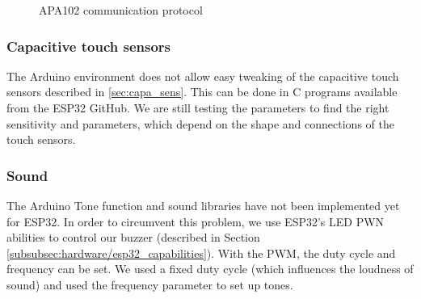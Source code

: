 \begin{figure}[H]
    \centering
    \hfill
    \hfill
    \caption{APA102 communication protocol} 
    \label{fig:APA102}
\end{figure}   
   
\subsubsection{Capacitive touch sensors}
The Arduino environment does not allow easy tweaking of the capacitive touch sensors described in \ref{sec:capa_sens}. This can be done in C programs available from the ESP32 GitHub. We are still testing the parameters to find the right sensitivity and parameters, which depend on the shape and connections of the touch sensors.


    \subsubsection{Sound}
The Arduino Tone function and sound libraries have not been implemented yet for ESP32. In order to circumvent this problem, we use ESP32's LED PWN abilities to control our buzzer (described in Section \ref{subsubsec:hardware/esp32_capabilities}). With the PWM, the duty cycle and frequency can be set. We used a fixed duty cycle (which influences the loudness of sound) and used the frequency parameter to set up tones.


